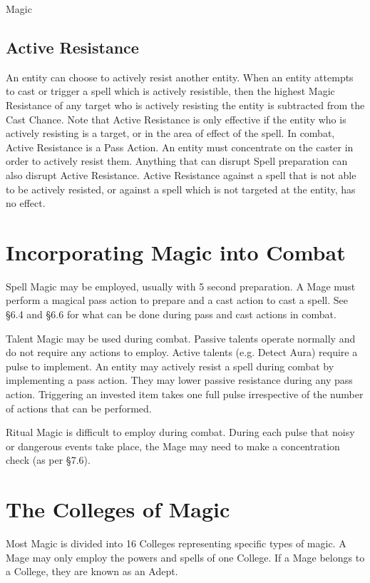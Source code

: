 \begin{Chapter}{Magic}
\subsection{Active Resistance}

An entity can choose to actively resist another entity. When an entity
attempts to cast or trigger a spell which is actively resistible, then
the highest Magic Resistance of any target who is actively resisting
the entity is subtracted from the Cast Chance.  Note that Active
Resistance is only effective if the entity who is actively resisting
is a target, or in the area of effect of the spell. In combat, Active
Resistance is a Pass Action. An entity must concentrate on the caster
in order to actively resist them.  Anything that can disrupt Spell
preparation can also disrupt Active Resistance.  Active Resistance
against a spell that is not able to be actively resisted, or against a
spell which is not targeted at the entity, has no effect.


\section{Incorporating Magic into Combat}

Spell Magic may be employed, usually with 5 second preparation. A Mage
must perform a magical pass action to prepare and a cast action to
cast a spell. See §6.4 and §6.6 for what can be done during pass and
cast actions in combat.

Talent Magic may be used during combat. Passive talents operate
normally and do not require any actions to employ. Active talents
(e.g. Detect Aura) require a pulse to implement.  An entity may
actively resist a spell during combat by implementing a pass action.
They may lower passive resistance during any pass action. Triggering
an invested item takes one full pulse irrespective of the number of
actions that can be performed.

Ritual Magic is difficult to employ during combat.  During each pulse
that noisy or dangerous events take place, the Mage may need to make a
concentration check (as per §7.6).


\section{The Colleges of Magic}

Most Magic is divided into 16 Colleges representing specific types of
magic.  A Mage may only employ the powers and spells of one College.
If a Mage belongs to a College, they are known as an Adept.


\end{Chapter}

